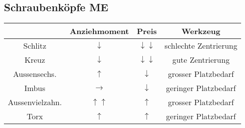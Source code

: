 \subsection{Schraubenköpfe \hfill ME}
\begin{footnotesize}
    \begin{center}
        \begin{tabular}{|c|c|c|c|}
            \hline
            \null & Anziehmoment & Preis & Werkzeug\\
            \hline
            Schlitz & $\downarrow$ & $\downarrow$$\downarrow$ & schlechte Zentrierung\\
            \hline
            Kreuz & $\downarrow$ & $\downarrow$$\downarrow$ & gute Zentrierung\\
            \hline
            Aussensechs. & $\uparrow$ & $\downarrow$ & grosser Platzbedarf\\
            \hline
            Imbus & $\to$ & $\downarrow$ & geringer Platzbedarf\\
            \hline
            Aussenvielzahn. & $\uparrow \uparrow$ & $\uparrow$ & grosser Platzbedarf\\
            \hline
            Torx & $\uparrow$ & $\uparrow$ & geringer Platzbedarf\\
            \hline
          \end{tabular}
    \end{center}
\end{footnotesize}